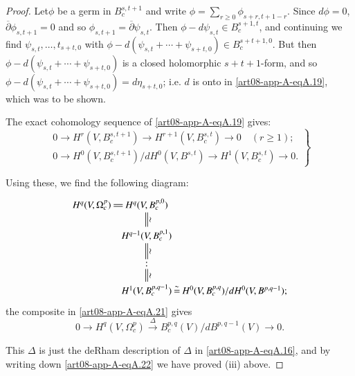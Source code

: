 \begin{proof}
Let\pageoriginale $\phi$ be a germ in $B^{s,t+1}_{c}$ and write $\phi=\sum\limits_{r\geq 0}\phi_{s+r,t+1-r}$. Since $d\phi=0$, $\overline{\partial}\phi_{s,t+1}=0$ and so $\phi_{s,t+1}=\overline{\partial}\psi_{s,t}$. Then $\phi-d\psi_{s,t}\in B^{s+1,t}_{c}$, and continuing we find $\psi_{s,t},\ldots,t_{s+t,0}$ with $\phi-d(\psi_{s,t}+\cdots+\psi_{s+t,0})\in B^{s+t+1,0}_{c}$. But then $\phi-d(\psi_{s,t}+\cdots+\psi_{s+t,0})$ is a closed holomorphic $s+t+1$-form, and so $\phi-d(\psi_{s,t}+\cdots+\psi_{s+t,0})=d\eta_{s+t,0}$; i.e. $d$ is onto in \eqref{art08-app-A-eqA.19}, which was to be shown.

The exact cohomology sequence of \eqref{art08-app-A-eqA.19} gives:
\begin{equation}
\left.
\begin{array}{l}
0\to H^{r}(V,B^{s,t+1}_{c})\to H^{r+1}(V,B^{s,t}_{c})\to 0\quad (r\geq 1);\\
0\to H^{0}(V,B^{s,t+1}_{c})/dH^{0}(V,B^{s,t})\to H^{1}(V,B^{s,t}_{c})\to 0.
\end{array}\right\}\label{art08-app-A-eqA.20}
\end{equation}

Using these, we find the following diagram:
\begin{equation}
\vcenter{\xymatrix@C=.17cm@R=.5cm{
H^{q}(V,\Omega^{p}_{c})\ar@{=}[r] & H^{q}(V,B^{p,0}_{c})\ar@{=}[d]^-{\rotatebox{90}{$\sim$}} & \\
 & H^{q-1}(V,B^{p,1}_{c})\ar@{=}[d]^-{\rotatebox{90}{$\sim$}} & \\
 & :\ar@{=}[d]^-{\rotatebox{90}{$\sim$}} & \\
 & H^{1}(V,B^{p,q-1}_{c})\ar@{=}[r]^-{\sim} & H^{0}(V,B^{p,q}_{c})/dH^{0}(V,B^{p,q-1}); 
}}\label{art08-app-A-eqA.21}
\end{equation}
the composite in \eqref{art08-app-A-eqA.21} gives
\begin{equation}
0\to H^{q}(V,\Omega^{p}_{c})\xrightarrow{\Delta}B^{p,q}_{c}(V)/dB^{p,q-1}(V)\to 0.\label{art08-app-A-eqA.22}
\end{equation}

This $\Delta$ is just the deRham description of $\Delta$ in \eqref{art08-app-A-eqA.16}, and by writing down \eqref{art08-app-A-eqA.22} we have proved (iii) above.
\end{proof}

